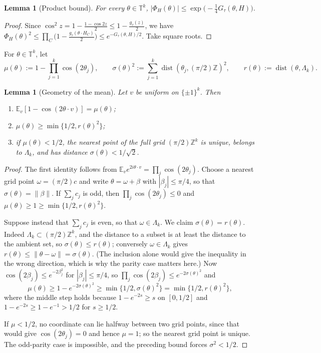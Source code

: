 \documentclass[11pt,reqno]{amsart}
\theoremstyle{plain}
\newtheorem{lemma}[theorem]{Lemma}
\theoremstyle{definition}
\theoremstyle{remark}
\newcommand{\T}{\mathbb T}
\newcommand{\Z}{\mathbb Z}
\DeclareMathOperator{\dist}{dist}
\begin{document}
\begin{lemma}[Product bound]\label{lem:product}
For every \(\theta\in\T^k\),
\(|\Phi_H(\theta)|\le\exp\bigl(-\tfrac14G_\tau(\theta,H)\bigr)\).
\end{lemma}

\begin{proof}
Since \(\cos^2z=1-\tfrac{1-\cos2z}2\le1-\tfrac{g_\tau(z)}2\), we have
\(\Phi_H(\theta)^2\le\prod_C\bigl(1-\tfrac{g_\tau(\theta\cdot H_C)}2\bigr)
\le e^{-G_\tau(\theta,H)/2}\). Take square roots.
\end{proof}

For \(\theta\in\T^k\), let
\[
  \mu(\theta):=1-\prod_{j=1}^k\cos(2\theta_j),\qquad
  \sigma(\theta)^2:=\sum_{j=1}^k\dist(\theta_j,(\pi/2)\Z)^2,\qquad
  r(\theta):=\dist(\theta,\Lambda_k).
\]

\begin{lemma}[Geometry of the mean]\label{lem:geometry}
Let \(v\) be uniform on \(\{\pm1\}^k\). Then
\begin{enumerate}
\item \(\mathbb E_v[1-\cos(2\theta\cdot v)]=\mu(\theta)\);
\item \(\mu(\theta)\ge\min\{1/2,r(\theta)^2\}\);
\item if \(\mu(\theta)<1/2\), the nearest point of the full grid
  \((\pi/2)\Z^k\) is unique, belongs to \(\Lambda_k\), and has distance
  \(\sigma(\theta)<1/\sqrt2\).
\end{enumerate}
\end{lemma}

\begin{proof}
The first identity follows from
\(\mathbb E_ve^{2i\theta\cdot v}=\prod_j\cos(2\theta_j)\). Choose a nearest
grid point \(\omega=(\pi/2)c\) and write \(\theta=\omega+\beta\) with
\(|\beta_j|\le\pi/4\), so that \(\sigma(\theta)=\|\beta\|\). If
\(\sum_jc_j\) is odd, then \(\prod_j\cos(2\theta_j)\le0\) and
\(\mu(\theta)\ge1\ge\min\{1/2,r(\theta)^2\}\).

Suppose instead that \(\sum_jc_j\) is even, so that \(\omega\in\Lambda_k\). We
claim \(\sigma(\theta)=r(\theta)\). Indeed \(\Lambda_k\subset(\pi/2)\Z^k\), and
the distance to a subset is at least the distance to the ambient set, so
\(\sigma(\theta)\le r(\theta)\); conversely \(\omega\in\Lambda_k\) gives
\(r(\theta)\le\|\theta-\omega\|=\sigma(\theta)\). (The inclusion alone would
give the inequality in the wrong direction, which is why the parity case
matters here.) Now \(\cos(2\beta_j)\le e^{-2\beta_j^2}\) for
\(|\beta_j|\le\pi/4\), so \(\prod_j\cos(2\beta_j)\le e^{-2\sigma(\theta)^2}\)
and
\[
  \mu(\theta)\ge1-e^{-2\sigma(\theta)^2}
  \ge\min\{1/2,\sigma(\theta)^2\}=\min\{1/2,r(\theta)^2\},
\]
where the middle step holds because \(1-e^{-2s}\ge s\) on \([0,1/2]\) and
\(1-e^{-2s}\ge1-e^{-1}>1/2\) for \(s\ge1/2\).

If \(\mu<1/2\), no coordinate can lie halfway between two grid points, since
that would give \(\cos(2\theta_j)=0\) and hence \(\mu=1\); so the nearest grid
point is unique. The odd-parity case is impossible, and the preceding bound
forces \(\sigma^2<1/2\).
\end{proof}
\end{document}
